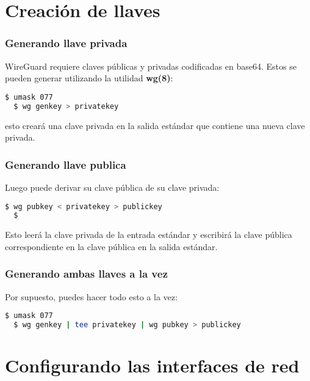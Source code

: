 \section{Creación de llaves}

\begin{frame}[fragile]
  \frametitle{Generando llave privada}

  WireGuard requiere claves públicas y privadas codificadas en base64.
  Estos se pueden generar utilizando la utilidad \textbf{wg(8)}: 

  \vspace{\baselineskip}
  \begin{lstlisting}[language=Bash]
  $ umask 077
  $ wg genkey > privatekey
  \end{lstlisting}

  \vspace{\baselineskip}
  esto creará una clave privada en la salida estándar que contiene una
  nueva clave privada. 
\end{frame}

\begin{frame}[fragile]
  \frametitle{Generando llave publica}

  Luego puede derivar su clave pública de su clave privada:

  \vspace{\baselineskip}
  \begin{lstlisting}[language=bash]
  $ wg pubkey < privatekey > publickey
  $
  \end{lstlisting}

  \vspace{\baselineskip}
  Esto leerá la clave privada de la entrada estándar y escribirá la
  clave pública correspondiente en la clave pública en la salida estándar.
\end{frame}

\begin{frame}[fragile]
  \frametitle{Generando ambas llaves a la vez}

  Por supuesto, puedes hacer todo esto a la vez: 

  \vspace{\baselineskip}
  \begin{lstlisting}[language=Bash]
  $ umask 077
  $ wg genkey | tee privatekey | wg pubkey > publickey
  \end{lstlisting}

\end{frame}

\section{Configurando las interfaces de red}

